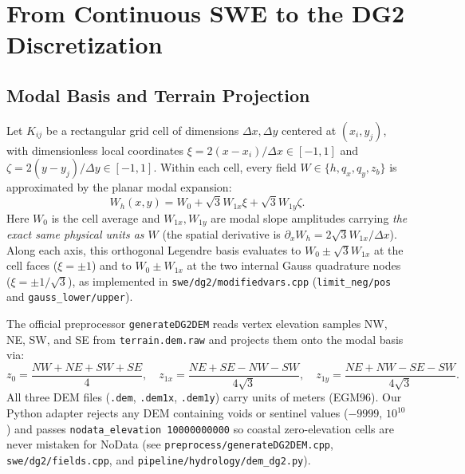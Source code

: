 \documentclass[11pt,a4paper]{article}
\newcommand{\src}[1]{\nolinkurl{#1}}
\begin{document}
\section{From Continuous SWE to the DG2 Discretization}
\label{sec:dg2}
\subsection{Modal Basis and Terrain Projection}
Let $K_{ij}$ be a rectangular grid cell of dimensions $\Delta x,\Delta y$ centered at $(x_i,y_j)$, with dimensionless local coordinates $\xi=2(x-x_i)/\Delta x \in [-1,1]$ and $\zeta=2(y-y_j)/\Delta y \in [-1,1]$. Within each cell, every field $W\in\{h,q_x,q_y,z_b\}$ is approximated by the planar modal expansion:
\begin{equation}
 W_h(x,y)=W_0+\sqrt3 W_{1x}\xi+\sqrt3 W_{1y}\zeta.\label{eq:basis}
\end{equation}
Here $W_0$ is the cell average and $W_{1x},W_{1y}$ are modal slope amplitudes carrying \emph{the exact same physical units as $W$} (the spatial derivative is $\partial_xW_h=2\sqrt3W_{1x}/\Delta x$). Along each axis, this orthogonal Legendre basis evaluates to $W_0\pm\sqrt3W_{1x}$ at the cell faces ($\xi=\pm 1$) and to $W_0\pm W_{1x}$ at the two internal Gauss quadrature nodes ($\xi=\pm 1/\sqrt3$), as implemented in \src{swe/dg2/modifiedvars.cpp} (\texttt{limit\_neg/pos} and \texttt{gauss\_lower/upper}).

The official preprocessor \texttt{generateDG2DEM} reads vertex elevation samples NW, NE, SW, and SE from \texttt{terrain.dem.raw} and projects them onto the modal basis via:
\begin{equation}
 z_0=\frac{NW+NE+SW+SE}{4},\quad
 z_{1x}=\frac{NE+SE-NW-SW}{4\sqrt3},\quad
 z_{1y}=\frac{NE+NW-SE-SW}{4\sqrt3}.\label{eq:vertices}
\end{equation}
All three DEM files (\texttt{.dem}, \texttt{.dem1x}, \texttt{.dem1y}) carry units of meters (EGM96). Our Python adapter rejects any DEM containing voids or sentinel values ($-9999$, $10^{10}$) and passes \texttt{nodata\_elevation 10000000000} so coastal zero-elevation cells are never mistaken for NoData (see \src{preprocess/generateDG2DEM.cpp}, \src{swe/dg2/fields.cpp}, and \src{pipeline/hydrology/dem_dg2.py}).
\end{document}
